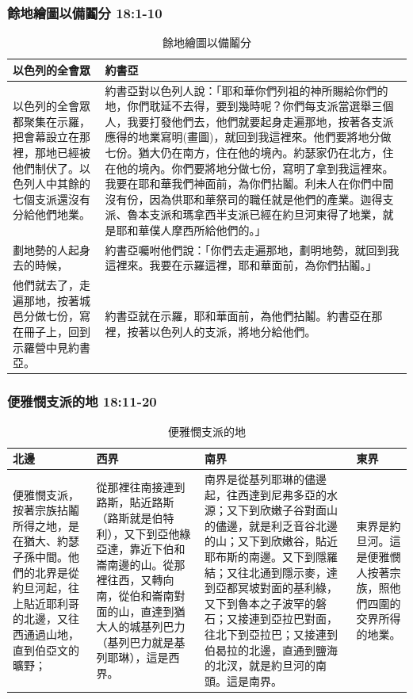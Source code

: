 \subsubsection{餘地繪圖以備鬮分 18:1-10}
\begin{table}[H]
\centering
\begin{tabular}{p{6.5cm}|p{10.5cm}}\hline\hline
以色列的全會眾&約書亞\\\hline
以色列的全會眾都聚集在示羅，把會幕設立在那裡，那地已經被他們制伏了。以色列人中其餘的七個支派還沒有分給他們地業。&約書亞對以色列人說：「耶和華你們列祖的神所賜給你們的地，你們耽延不去得，要到幾時呢？你們每支派當選舉三個人，我要打發他們去，他們就要起身走遍那地，按著各支派應得的地業寫明(畫圖)，就回到我這裡來。他們要將地分做七份。猶大仍在南方，住在他的境內。約瑟家仍在北方，住在他的境內。你們要將地分做七份，寫明了拿到我這裡來。我要在耶和華我們神面前，為你們拈鬮。利未人在你們中間沒有份，因為供耶和華祭司的職任就是他們的產業。迦得支派、魯本支派和瑪拿西半支派已經在約旦河東得了地業，就是耶和華僕人摩西所給他們的。」\\\hline
劃地勢的人起身去的時候，&約書亞囑咐他們說：「你們去走遍那地，劃明地勢，就回到我這裡來。我要在示羅這裡，耶和華面前，為你們拈鬮。」\\\hline
他們就去了，走遍那地，按著城邑分做七份，寫在冊子上，回到示羅營中見約書亞。&約書亞就在示羅，耶和華面前，為他們拈鬮。約書亞在那裡，按著以色列人的支派，將地分給他們。\\\hline
 \end{tabular}
\caption{餘地繪圖以備鬮分}
\end{table}






\subsubsection{便雅憫支派的地 18:11-20}
\begin{table}[H]
\centering
\begin{tabular}{p{}|p{4.2cm}|p{}|p{1.5cm}}\hline\hline
北邊&西界&南界&東界\\\hline
便雅憫支派，按著宗族拈鬮所得之地，是在猶大、約瑟子孫中間。他們的北界是從約旦河起，往上貼近耶利哥的北邊，又往西通過山地，直到伯亞文的曠野；
&從那裡往南接連到路斯，貼近路斯（路斯就是伯特利），又下到亞他綠亞達，靠近下伯和崙南邊的山。從那裡往西，又轉向南，從伯和崙南對面的山，直達到猶大人的城基列巴力（基列巴力就是基列耶琳），這是西界。
&南界是從基列耶琳的儘邊起，往西達到尼弗多亞的水源；又下到欣嫩子谷對面山的儘邊，就是利乏音谷北邊的山；又下到欣嫩谷，貼近耶布斯的南邊。又下到隱羅結；又往北通到隱示麥，達到亞都冥坡對面的基利綠，又下到魯本之子波罕的磐石；又接連到亞拉巴對面，往北下到亞拉巴；又接連到伯曷拉的北邊，直通到鹽海的北汊，就是約旦河的南頭。這是南界。
&東界是約旦河。這是便雅憫人按著宗族，照他們四圍的交界所得的地業。\\\hline
 \end{tabular}
\caption{便雅憫支派的地}
\end{table}





